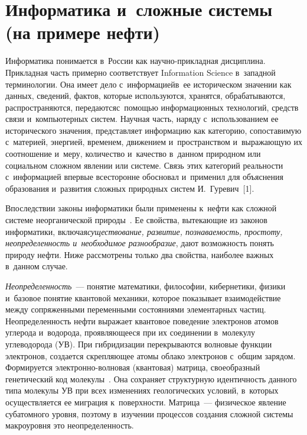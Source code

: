 \thispagestyle{headings}

\begin{multicols}{2}

\label{st\stat}

\section{Информатика и~сложные системы (на примере нефти)}


    Информатика понимается в~России как на\-уч\-но-при\-клад\-ная дисциплина. 
Прикладная часть примерно соответствует Information Science в~западной 
терминологии. Она имеет дело с~информацией\linebreak в~ее историческом значении как 
данных, сведений, фактов, которые используются, хранятся, обрабатываются, 
распространяются, передаются\linebreak с~по\-мощью информационных технологий, средств 
связи и~компьютерных систем. Научная часть, наряду с~использованием ее 
исторического значения, представляет информацию как категорию, 
сопоставимую с~материей, энергией, временем, движением и~пространством 
и~выражающую их соотношение и~меру, количество и~качество в~данном 
природном или социальном сложном явлении или системе. Связь этих категорий 
реальности с~информацией впервые всесторонне обосновал и~применил для 
объяснения образования и~развития сложных природных систем И.~Гуревич~[1]. 

Впоследствии законы информатики были применены к~нефти как сложной 
сис\-те\-ме неорганической природы~\cite[c.~104--124]{2-s}. Ее свойства, 
вытекающие из законов информатики, включая\linebreak \textit{существование, развитие, 
познаваемость, простоту, неопределенность и~необходимое разнообразие}, дают 
возможность понять природу нефти. Ниже рассмотрены только два свойства, 
наиболее важных в~данном случае.
    
    \textit{Неопределенность}~--- понятие математики, философии, кибернетики, 
физики и~базовое понятие квантовой механики, которое показывает 
взаимодействие между сопряженными переменными состояниями элементарных 
частиц. Неопределенность нефти выражает квантовое поведение электронов 
атомов углерода и~водорода, проявляющееся при их соединении в~молекулу 
углеводорода (УВ). При гибридизации перекрываются волновые функции 
электронов, создается скрепляющее атомы облако электронов с~общим зарядом. 
Формируется элект\-рон\-но-вол\-но\-вая (квантовая) матрица, своеобразный 
генетический код молекулы~\cite{3-s}. Она сохраняет структурную идентичность 
данного типа молекулы УВ при всех изменениях геологических 
условий, в~которых осуществляется ее миграция к~поверхности. Матрица~--- 
физическое явление субатомного уровня, поэтому в~изучении процессов создания 
сложной системы макроуровня это неопределенность. 
    

\end{multicols}
